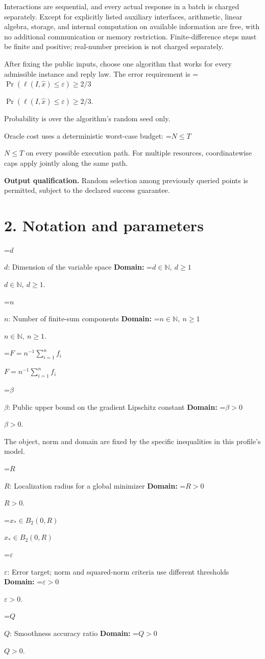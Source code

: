 \documentclass[10pt,a4paper]{article}
\newcommand{\AtlasMath}[1]{\par\begingroup\centering\setbox0=\hbox{$\displaystyle #1$}\ifdim\wd0>1.4\linewidth\typeout{ATLAS WIDE FORMULA: \the\wd0}\fi\ifdim\wd0>\linewidth\resizebox{\linewidth}{!}{\box0}\else\box0\fi\par\endgroup}
\newcommand{\AtlasInlineMath}[1]{\begingroup\setbox0=\hbox{$#1$}\ifdim\wd0>.4\linewidth\endgroup\AtlasMath{#1}\else\endgroup$#1$\fi}
\begin{document}
Interactions are sequential, and every actual response in a batch is charged separately. Except for explicitly listed auxiliary interfaces, arithmetic, linear algebra, storage, and internal computation on available information are free, with no additional communication or memory restriction. Finite-difference steps must be finite and positive; real-number precision is not charged separately.

After fixing the public inputs, choose one algorithm that works for every admissible instance and reply law. The error requirement is \AtlasInlineMath{\Pr(\ell(I,\widehat{x})\le \varepsilon)\ge2/3}.

Probability is over the algorithm's random seed only.

Oracle cost uses a deterministic worst-case budget: \AtlasInlineMath{N\le T} on every possible execution path. For multiple resources, coordinatewise caps apply jointly along the same path.

\textbf{Output qualification.} Random selection among previously queried points is permitted, subject to the declared success guarantee.

\section{2. Notation and parameters}
\AtlasInlineMath{d}: Dimension of the variable space \textbf{Domain:} \AtlasInlineMath{d\in\mathbb{N},\ d\ge1}.

\AtlasInlineMath{n}: Number of finite-sum components \textbf{Domain:} \AtlasInlineMath{n\in\mathbb{N},\ n\ge1}.

\AtlasInlineMath{F=n^{-1}\sum_{i=1}^n f_i}

\AtlasInlineMath{\beta}: Public upper bound on the gradient Lipschitz constant \textbf{Domain:} \AtlasInlineMath{\beta>0}.

The object, norm and domain are fixed by the specific inequalities in this profile's model.

\AtlasInlineMath{R}: Localization radius for a global minimizer \textbf{Domain:} \AtlasInlineMath{R>0}.

\AtlasInlineMath{x_*\in B_2(0,R)}

\AtlasInlineMath{\varepsilon}: Error target; norm and squared-norm criteria use different thresholds \textbf{Domain:} \AtlasInlineMath{\varepsilon>0}.

\AtlasInlineMath{Q}: Smoothness accuracy ratio \textbf{Domain:} \AtlasInlineMath{Q>0}.
\end{document}
